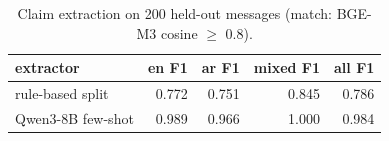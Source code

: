 \begin{table}[t]
\centering
\caption{Claim extraction on 200 held-out messages (match: BGE-M3 cosine $\geq$ 0.8).}
\label{tab:tab_claims}
\begin{tabular}{lrrrr}
\toprule
extractor & en F1 & ar F1 & mixed F1 & all F1 \\
\midrule
rule-based split & 0.772 & 0.751 & 0.845 & 0.786 \\
Qwen3-8B few-shot & 0.989 & 0.966 & 1.000 & 0.984 \\
\bottomrule
\end{tabular}
\end{table}
